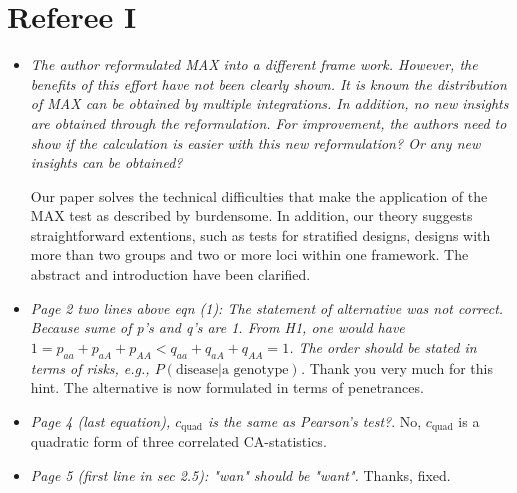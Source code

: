 \documentclass{article}
\begin{document}
\section{Referee I}

\begin{itemize}
\item \textit{The author reformulated MAX into a different frame work. 
However, the benefits of this effort have not been clearly shown. It is 
known the distribution of MAX can be obtained by multiple integrations. 
In addition, no new insights are obtained through the reformulation.
For improvement, the authors need to show if the calculation is easier 
with this new reformulation? Or any new insights can be obtained?}

Our paper solves the technical difficulties that make
the application of the MAX test as described by 
\cite{Freidlin:2002} burdensome. In addition, our theory
suggests straightforward extentions, such as
tests for stratified designs, designs with more than two
groups and two or more loci within one framework. 
The abstract and introduction have been clarified.

\item
\textit{Page 2 two lines above eqn (1): The statement of alternative was not 
correct. Because sume of p's and q's are 1. From H1, one would have 
$1 =p_{aa}+p_{aA}+p_{AA} < q_{aa}+q_{aA}+q_{AA}=1$. 
The order should be stated in terms of risks, e.g., $P(\text{disease}|\text{a
genotype})$.}
Thank you very much for this hint. The alternative is now formulated
in terms of penetrances.

\item
\textit{Page 4 (last equation), $c_\text{quad}$ is the same as Pearson's test?}.
No, $c_\text{quad}$ is a quadratic form of three correlated CA-statistics.

\item
\textit{Page 5 (first line in sec 2.5): "wan" should be "want".}
Thanks, fixed.
\end{itemize}
\end{document}
